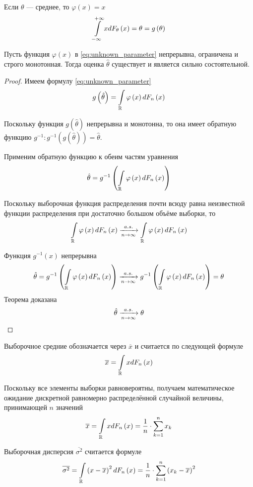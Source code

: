 \begin{example} Если $\theta$ --- среднее, то $\varphi\left(x\right)=x$
$$\int\limits_{-\infty}^{+\infty}xdF_{\theta}\left(x\right)
    =\theta=g\left(\theta\right)$$
\end{example}
\begin{theorem}Пусть функция $\varphi\left( x \right)$
    в \eqref{eq:unknown_parameter} непрерывна, ограничена и строго монотонная.
    Тогда оценка $\hat{\theta}$ существует и является сильно состоятельной.
\end{theorem}
\begin{proof}
    Имеем формулу \eqref{eq:unknown_parameter}
    $$g\left(\hat{\theta}\right)
            =\int\limits_{\mathbb{R}}\varphi\left(x\right)dF_n\left(x\right)$$

    Поскольку функция $g\left(\hat{\theta}\right)$ непрерывна и монотонна,
    то она имеет обратную функцию
    $g^{-1}:g^{-1}\left(g\left(\hat{\theta}\right)\right)=\hat{\theta}$.

    Применим обратную функцию к обеим частям уравнения
    $$\hat{\theta}
            =g^{-1}\left(
                \int\limits_{\mathbb{R}}\varphi\left(x\right)dF_n\left(x\right)\right)$$

    Поскольку выборочная функция распределения почти всюду равна
    неизвестной функции распределения при достаточно большом объёме выборки,
    то
    $$\int\limits_{\mathbb{R}}\varphi\left(x\right)dF_n\left(x\right)\xrightarrow[n\to\infty]{a.s.}
        \int\limits_{\mathbb{R}}\varphi\left(x\right)dF_n\left(x\right)$$

    Функция $g^{-1}\left(x\right)$ непрерывна
    $$\hat{\theta}
        =g^{-1}\left(
            \int\limits_{\mathbb{R}}\varphi\left(x\right)dF_n\left(x\right)\right)
        \xrightarrow[n\to\infty]{a.s.} g^{-1}\left(
            \int\limits_{\mathbb{R}}\varphi\left(x\right)dF_n\left(x\right)\right)
        =\theta$$
    Теорема доказана
    $$\hat{\theta}\xrightarrow[n\to\infty]{a.s.}\theta$$
\end{proof}
\begin{definition}
    Выборочное средние обозначается через $\overline{x}$
    и считается по следующей формуле
    $$\overline{x}=\int\limits_{\mathbb{R}}xdF_n\left(x\right)$$

    Поскольку все элементы выборки равновероятны,
    получаем математическое ожидание
    дискретной равномерно распределённой случайной величины,
    принимающей $n$ значений
    $$\overline{x}=\int\limits_{\mathbb{R}}xdF_n\left(x\right)
        =\frac{1}{n}\cdot\sum_{k=1}^n x_k$$
\end{definition}
\begin{definition}
    Выборочная дисперсия $\overline{\sigma^2}$
    считается формуле
    $$\overline{\sigma^2}
        =\int\limits_{\mathbb{R}}\left(x-\overline{x}\right)^2dF_n\left(x\right)
        =\frac{1}{n}\cdot\sum_{k=1}^n \left(x_k-\overline{x}\right)^2$$
\end{definition}
